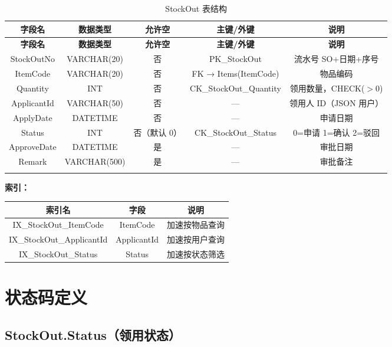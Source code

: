 \documentclass[12pt,a4paper]{ctexart}
\begin{document}
\begin{longtable}{c|c|c|c|c}
\toprule
\textbf{字段名} & \textbf{数据类型} & \textbf{允许空} & \textbf{主键/外键} & \textbf{说明} \\
\midrule
\endfirsthead
\toprule
\textbf{字段名} & \textbf{数据类型} & \textbf{允许空} & \textbf{主键/外键} & \textbf{说明} \\
\midrule
\endhead
StockOutNo  & VARCHAR(20)   & 否 & PK\_StockOut               & 流水号 SO+日期+序号 \\
ItemCode    & VARCHAR(20)   & 否 & FK → Items(ItemCode)       & 物品编码 \\
Quantity    & INT           & 否 & CK\_StockOut\_Quantity     & 领用数量，CHECK($>$0) \\
ApplicantId & VARCHAR(50)   & 否 & —                          & 领用人 ID（JSON 用户） \\
ApplyDate   & DATETIME      & 否 & —                          & 申请日期 \\
Status      & INT           & 否（默认 0）& CK\_StockOut\_Status   & 0=申请 1=确认 2=驳回 \\
ApproveDate & DATETIME      & 是 & —                          & 审批日期 \\
Remark      & VARCHAR(500)  & 是 & —                          & 审批备注 \\
\bottomrule
\caption{StockOut 表结构}
\end{longtable}

\vspace{4pt}
\textbf{索引：}

\begin{tabular}{c|c|c}
\toprule
\textbf{索引名} & \textbf{字段} & \textbf{说明} \\
\midrule
IX\_StockOut\_ItemCode    & ItemCode    & 加速按物品查询 \\
IX\_StockOut\_ApplicantId & ApplicantId & 加速按用户查询 \\
IX\_StockOut\_Status      & Status      & 加速按状态筛选 \\
\bottomrule
\end{tabular}

\section{状态码定义}

\subsection{StockOut.Status（领用状态）}
\end{document}

